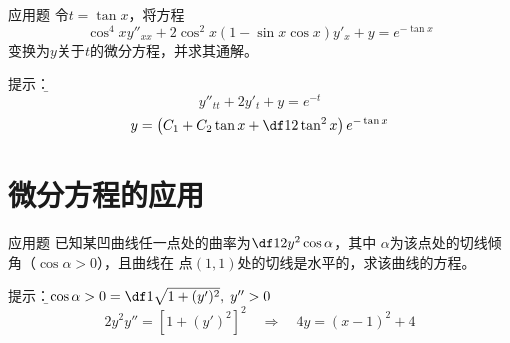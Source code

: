 % 	

\begin{frame}{应用题}
	\linespread{1.2}
	\;令$t=\tan x$，将方程
	$$\cos^4xy''_{xx}+2\cos^2x(1-\sin x\cos x)y'_x+y=e^{-\tan x}$$
	变换为$y$关于$t$的微分方程，并求其通解。
	
	\pause\alert{提示：}\it\b 
	$$y''_{tt}+2y'_t+y=e^{-t}$$
	$$y=\left(C_1+C_2\tan x+\df12\tan^2x\right)e^{-\tan x}$$
\end{frame}

\section{微分方程的应用}

\begin{frame}{应用题}
	\linespread{1.4}
	\;已知某凹曲线任一点处的曲率为$\df1{2y^2\cos\alpha}$，其中
	$\alpha$为该点处的切线倾角（$\cos\alpha>0$），且曲线在
	点$(1,1)$处的切线是水平的，求该曲线的方程。
	
	\pause\alert{提示：}\it\b $\cos\alpha>0=\df1{\sqrt{1+(y')^2}},
	\;y''>0$
	$$2y^2y''=[1+(y')^2]^2\quad\Rightarrow\quad
	4y=(x-1)^2+4$$
\end{frame}

% 	

